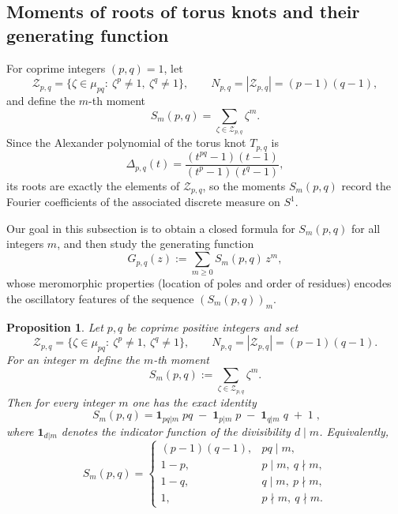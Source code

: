 \documentclass[table]{amsart}
\newtheorem{proposition}[theorem]{Proposition}
\numberwithin{equation}{section}
\begin{document}
\subsection{Moments of roots of torus knots and their generating function}
\par For coprime integers \((p,q)=1\), let
\[
\mathcal{Z}_{p,q}=\{\zeta\in\mu_{pq}:\ \zeta^p\neq1,\ \zeta^q\neq1\}, \qquad
N_{p,q}=|\mathcal{Z}_{p,q}|=(p-1)(q-1),
\]
and define the \(m\)-th moment
\[
S_m(p,q)=\sum_{\zeta\in\mathcal{Z}_{p,q}}\zeta^m.
\]
Since the Alexander polynomial of the torus knot \(T_{p,q}\) is
\[
\Delta_{p,q}(t)=\frac{(t^{pq}-1)(t-1)}{(t^p-1)(t^q-1)},
\]
its roots are exactly the elements of \(\mathcal{Z}_{p,q}\), so the moments \(S_m(p,q)\) record the Fourier coefficients of the associated discrete measure on \(S^1\).

\par Our goal in this subsection is to obtain a closed formula for \(S_m(p,q)\) for all integers \(m\), and then study the generating function
\[
G_{p,q}(z):=\sum_{m\ge0} S_m(p,q)\,z^m,
\] whose meromorphic properties (location of poles and order of residues) encodes the oscillatory features of the sequence \((S_m(p,q))_m\).

\begin{proposition}
Let \(p,q\) be coprime positive integers and set
\[
\mathcal{Z}_{p,q}=\{\zeta\in\mu_{pq}:\ \zeta^p\neq1,\ \zeta^q\neq1\},
\qquad
N_{p,q}=|\mathcal{Z}_{p,q}|=(p-1)(q-1).
\]
For an integer \(m\) define the \(m\)-th moment
\[
S_m(p,q):=\sum_{\zeta\in\mathcal{Z}_{p,q}}\zeta^m.
\]
Then for every integer \(m\) one has the exact identity
\[
\; S_m(p,q)= \mathbf{1}_{pq|m}\;pq \;-\; \mathbf{1}_{p|m}\;p \;-\; \mathbf{1}_{q|m}\;q \;+\; 1 \; ,
\]
where \(\mathbf{1}_{d| m}\) denotes the indicator function of the divisibility \(d\mid m\).
Equivalently,
\[
S_m(p,q)=
\begin{cases}
(p-1)(q-1), & pq\mid m,\\[4pt]
1-p, & p\mid m,\ q\nmid m,\\[4pt]
1-q, & q\mid m,\ p\nmid m,\\[4pt]
1, & p\nmid m,\ q\nmid m.
\end{cases}
\]
\end{proposition}
\end{document}
